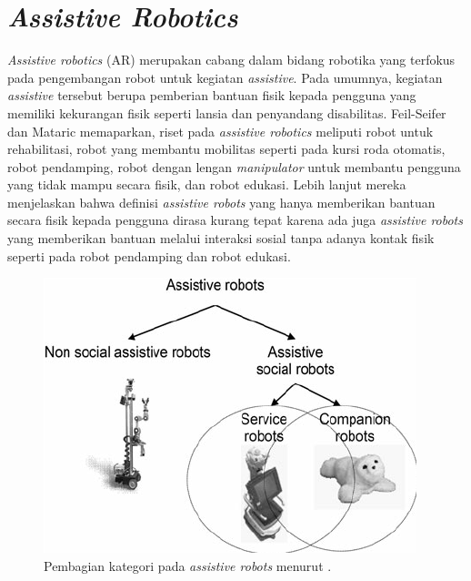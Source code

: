 \section{\emph{Assistive Robotics}}
\label{sec:sociallyassistiverobots}

\emph{Assistive robotics} (AR) merupakan cabang dalam bidang robotika yang terfokus pada pengembangan robot untuk kegiatan \emph{assistive}.
Pada umumnya, kegiatan \emph{assistive} tersebut berupa pemberian bantuan fisik kepada pengguna yang memiliki kekurangan fisik seperti lansia dan penyandang disabilitas.
Feil-Seifer dan Mataric \citet{cit:seifer2005} memaparkan,
  riset pada \emph{assistive robotics} meliputi robot untuk rehabilitasi,
  robot yang membantu mobilitas seperti pada kursi roda otomatis,
  robot pendamping,
  robot dengan lengan \emph{manipulator} untuk membantu pengguna yang tidak mampu secara fisik,
  dan robot edukasi.
Lebih lanjut mereka menjelaskan bahwa definisi \emph{assistive robots} yang hanya memberikan bantuan secara fisik kepada pengguna dirasa kurang tepat karena ada juga \emph{assistive robots} yang memberikan bantuan melalui interaksi sosial tanpa adanya kontak fisik seperti pada robot pendamping dan robot edukasi.

\begin{figure}[ht]
  \centering
  \includegraphics[scale=0.45]{gambar/kategori-assistive-robots.png}
  \caption{Pembagian kategori pada \emph{assistive robots} menurut \citet{cit:heerink2010}.}
  \label{fig:kategoriassistiverobots}
\end{figure}


